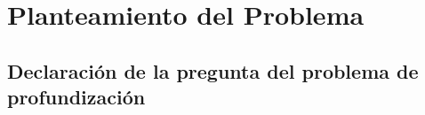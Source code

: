 \chapter{Planteamiento del Problema}




\section{Declaración de la pregunta del problema de profundización}




